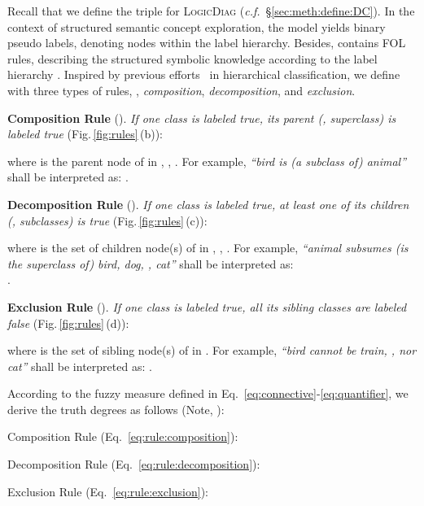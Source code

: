 \documentclass[10pt,twocolumn,letterpaper]{article}
\def\Ours{{\textsc{LogicDiag}}}
\begin{document}
Recall that we define the  triple  for {\Ours} (\textit{c.f.\!}~\S\ref{sec:meth:define:DC}).
In the context of structured semantic concept exploration, the model  yields  binary pseudo labels, denoting nodes within the label hierarchy.
Besides,  contains FOL rules, describing the structured symbolic knowledge according to the label hierarchy . Inspired by previous efforts~\cite{li2022deep,deng2014large,bi2011multi} in hierarchical classification, we define  with three types of rules, \ie, \textit{composition}, \textit{decomposition}, and \textit{exclusion}.


\noindent \textbf{Composition Rule} (). \textit{If one class is labeled true, its parent (\ie, superclass) is labeled true} (Fig.\,\ref{fig:rules}\,(b)):
\vspace{-3pt}

where  is the parent node of  in , \ie, .
For example, \textit{``bird is (a subclass of) animal''} shall be interpreted as: .

\noindent \textbf{Decomposition Rule} (). \textit{If one class is labeled true,} \textit{at least one of its children (\ie, subclasses) is true} (Fig.\,\ref{fig:rules}\,(c)):
\vspace{-3pt}

where  is the set of children node(s) of  in , \ie, .
For example, \textit{``animal subsumes (is the superclass of) bird, dog, , cat''} shall be interpreted as:\\ .

\noindent \textbf{Exclusion Rule} (). \textit{If one class is labeled true, all its sibling classes are labeled false} (Fig.\,\ref{fig:rules}\,(d)):
\vspace{-3pt}

where  is the set of sibling node(s) of  in .
For example, \textit{``bird cannot be train, , nor cat''} shall be interpreted as: .

According to the fuzzy measure defined in Eq.~\ref{eq:connective}-\ref{eq:quantifier}, we derive the truth degrees as follows (Note, ):

\noindent Composition Rule (Eq.~\ref{eq:rule:composition}): 
\vspace{-3pt}


\noindent Decomposition Rule (Eq.~\ref{eq:rule:decomposition}): 
\vspace{-3pt}


\noindent Exclusion Rule (Eq.~\ref{eq:rule:exclusion}): 
\vspace{-3pt}
\end{document}
